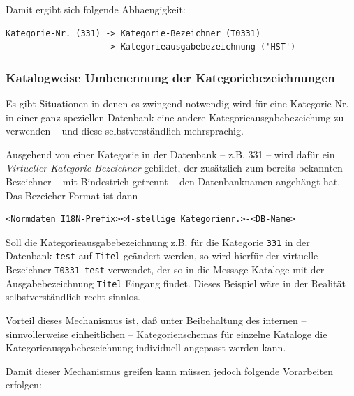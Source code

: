 \documentclass[11pt, twoside, a4paper, BCOR8mm, DIV12, bibtotoc,idxtotoc]{scrbook}
\begin{document}
Damit ergibt sich folgende Abhaengigkeit:

\begin{verbatim}
Kategorie-Nr. (331) -> Kategorie-Bezeichner (T0331) 
                    -> Kategorieausgabebezeichnung ('HST')
\end{verbatim}

\subsubsection{Katalogweise Umbenennung der Kategoriebezeichnungen}

Es gibt Situationen in denen es zwingend notwendig wird für eine
Kategorie-Nr. in einer ganz speziellen Datenbank eine andere
Kategorieausgabe\-bezeichung zu verwenden -- und diese
selbstverständlich mehrsprachig.

Ausgehend von einer Kategorie in der Datenbank -- z.B. 331 -- wird
dafür ein \emph{Virtueller Kategorie-Bezeichner} gebildet, der
zusätzlich zum bereits bekannten Bezeichner -- mit Bindestrich
getrennt -- den Datenbanknamen angehängt hat. Das Bezeicher-Format ist
dann

\begin{verbatim}
<Normdaten I18N-Prefix><4-stellige Kategorienr.>-<DB-Name>
\end{verbatim}

Soll die Kategorieausgabebezeichnung z.B. für die Kategorie
\texttt{331} in der Datenbank \texttt{test} auf \texttt{Titel}
geändert werden, so wird hierfür der virtuelle Bezeichner
\texttt{T0331-test} verwendet, der so in die Message-Kataloge mit der
Ausgabebezeichnung \texttt{Titel} Eingang findet. Dieses Beispiel wäre
in der Realität selbstverständlich recht sinnlos.

Vorteil dieses Mechanismus ist, daß unter Beibehaltung des internen --
sinnvollerweise einheitlichen -- Kategorienschemas für einzelne
Kataloge die Kategorieausgabebezeichnung individuell angepasst werden
kann.

Damit dieser Mechanismus greifen kann müssen jedoch folgende
Vorarbeiten erfolgen:
\end{document}
